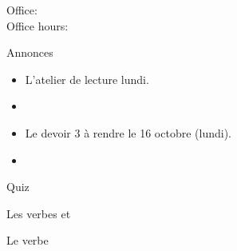 \documentclass{beamer}
\subtitle[Carrières et verbes]{Les carrières et les verbes \lexi{pouvoir}, \lexi{devoir}, \lexi{vouloir}}
\begin{document}
  \begin{frame}
    \titlepage
    \tiny{Office: \\
          Office hours: }
  \end{frame}

  \begin{frame}{Annonces}
    \begin{itemize}
      \item L'atelier de lecture lundi.
      \item[] 
      \item Le devoir 3 à rendre le 16 octobre (lundi).
      \item[] 
    \end{itemize}
  \end{frame}

  \begin{frame}{}
    \begin{center}
      \Large Quiz
    \end{center}
  \end{frame}

  \begin{frame}{Les verbes  et }
    \scriptsize
        \begin{center}
          \noindent
          \noindent
        \end{center}
  \end{frame}

  \begin{frame}{Le verbe }
    \begin{center}
      
    \end{center}
  \end{frame}
\end{document}
